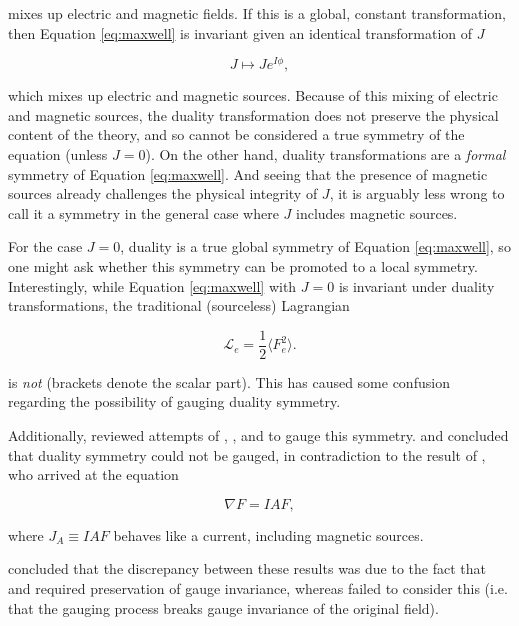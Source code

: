 \documentclass{article}
\begin{document}
  mixes up electric and magnetic fields. If this is a global, constant transformation, then Equation \ref{eq:maxwell} is invariant given an identical transformation of $J$

  \begin{equation}
    J \mapsto J e^{I \phi},
  \end{equation}

  which mixes up electric and magnetic sources. Because of this mixing of electric and magnetic sources, the duality transformation does not preserve the physical content of the theory, and so cannot be considered a true symmetry of the equation (unless $J=0$). On the other hand, duality transformations are a \emph{formal} symmetry of Equation \ref{eq:maxwell}. And seeing that the presence of magnetic sources already challenges the physical integrity of $J$, it is arguably less wrong to call it a symmetry in the general case where $J$ includes magnetic sources.

  For the case $J=0$, duality is a true global symmetry of Equation \ref{eq:maxwell}, so one might ask whether this symmetry can be promoted to a local symmetry. Interestingly, while Equation \ref{eq:maxwell} with $J=0$ is invariant under duality transformations, the traditional (sourceless) Lagrangian

  \begin{equation}
    \mathcal{L}_e = \frac{1}{2} \langle F_e^2 \rangle.\label{eq:elagrangian}
  \end{equation}

  is \emph{not} (brackets denote the scalar part). This has caused some confusion regarding the possibility of gauging duality symmetry. 

  Additionally, \cite{saa} reviewed attempts of \cite{malik}, \cite{bunster}, and \cite{deser} to gauge this symmetry. \cite{bunster} and \cite{deser} concluded that duality symmetry could not be gauged, in contradiction to the result of \cite{malik}, who arrived at the equation

  \begin{equation}
    \nabla F = I A F,\label{eq:malik}
  \end{equation}

  where $J_A \equiv IAF$ behaves like a current, including magnetic sources.

  \cite{saa} concluded that the discrepancy between these results was due to the fact that \cite{bunster} and \cite{deser} required preservation of gauge invariance, whereas \cite{malik} failed to consider this (i.e. that the gauging process breaks gauge invariance of the original field).  
\end{document}
